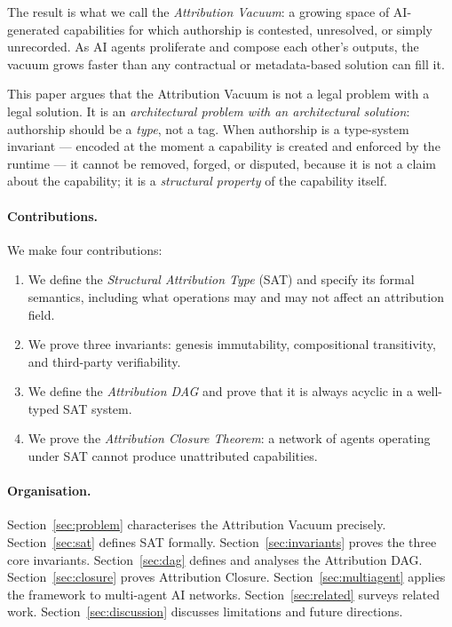 \documentclass[12pt]{article}
\begin{document}
The result is what we call the \emph{Attribution Vacuum}: a growing space of
AI-generated capabilities for which authorship is contested, unresolved, or
simply unrecorded.  As AI agents proliferate and compose each other's outputs,
the vacuum grows faster than any contractual or metadata-based solution can
fill it.

This paper argues that the Attribution Vacuum is not a legal problem with a
legal solution.  It is an \emph{architectural problem with an architectural
solution}: authorship should be a \emph{type}, not a tag.  When authorship is
a type-system invariant — encoded at the moment a capability is created and
enforced by the runtime — it cannot be removed, forged, or disputed, because
it is not a claim about the capability; it is a \emph{structural property} of
the capability itself.

\paragraph{Contributions.}  We make four contributions:
\begin{enumerate}[label=(\arabic*)]
  \item We define the \emph{Structural Attribution Type} (SAT) and specify its
    formal semantics, including what operations may and may not affect an
    attribution field.
  \item We prove three invariants: genesis immutability, compositional
    transitivity, and third-party verifiability.
  \item We define the \emph{Attribution DAG} and prove that it is always
    acyclic in a well-typed SAT system.
  \item We prove the \emph{Attribution Closure Theorem}: a network of agents
    operating under SAT cannot produce unattributed capabilities.
\end{enumerate}

\paragraph{Organisation.}
Section~\ref{sec:problem} characterises the Attribution Vacuum precisely.
Section~\ref{sec:sat} defines SAT formally.
Section~\ref{sec:invariants} proves the three core invariants.
Section~\ref{sec:dag} defines and analyses the Attribution DAG.
Section~\ref{sec:closure} proves Attribution Closure.
Section~\ref{sec:multiagent} applies the framework to multi-agent AI networks.
Section~\ref{sec:related} surveys related work.
Section~\ref{sec:discussion} discusses limitations and future directions.
\end{document}

